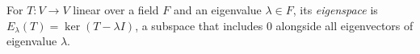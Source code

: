 
For $T:V\to V$ linear over a field $F$ and an eigenvalue $\lambda\in F$, its \emph{eigenspace} is $E_\lambda(T)=\ker(T-\lambda I)$, a subspace that includes $0$ alongside all eigenvectors of eigenvalue $\lambda$.
